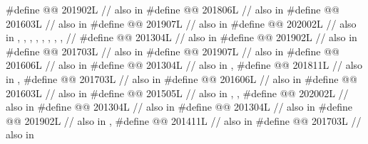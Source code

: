 \begin{codeblock}
#define @@                         201902L // also in 
#define @@                 201806L // also in 
#define @@           201603L // also in 
#define @@                            201907L // also in 
#define @@                          202002L
  // also in , , , , , , , ,
  // 
#define @@                 201304L // also in 
#define @@                         201902L // also in 
#define @@                        201703L // also in 
#define @@                            201907L // also in 
#define @@                           201606L // also in 
#define @@        201304L // also in , 
#define @@          201811L
  // also in , 
#define @@        201703L // also in 
#define @@ 201606L // also in 
#define @@                             201603L // also in 
#define @@     201505L
  // also in , , 
#define @@                          202002L // also in 
#define @@                  201304L // also in 
#define @@        201304L // also in 
#define @@                       201902L // also in , 
#define @@                            201411L // also in 
#define @@                      201703L // also in 

\end{codeblock}
